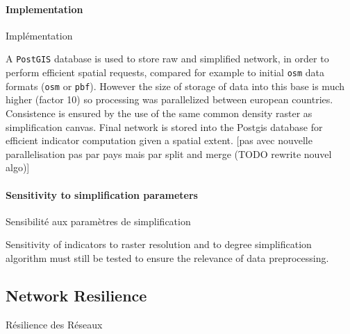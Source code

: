 


\paragraph{Implementation}{Implémentation}

A \texttt{PostGIS} database is used to store raw and simplified network, in order to perform efficient spatial requests, compared for example to initial \texttt{osm} data formats (\texttt{osm} or \texttt{pbf}). However the size of storage of data into this base is much higher (factor 10) so processing was parallelized between european countries. Consistence is ensured by the use of the same common density raster as simplification canvas. Final network is stored into the Postgis database for efficient indicator computation given a spatial extent. [pas avec nouvelle parallelisation pas par pays mais par split and merge (TODO rewrite nouvel algo)]


\paragraph{Sensitivity to simplification parameters}{Sensibilité aux paramètres de simplification}

Sensitivity of indicators to raster resolution and to degree simplification algorithm must still be tested to ensure the relevance of data preprocessing.









\subsection{Network Resilience}{Résilience des Réseaux}





